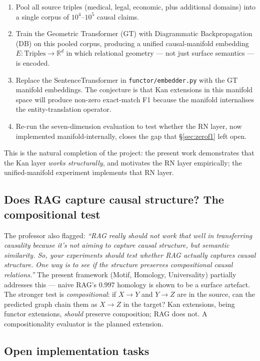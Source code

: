 \documentclass[10pt,letterpaper]{article}
\begin{document}
\begin{enumerate}
\item Pool all source triples (medical, legal, economic, plus additional domains) into a single corpus of $10^4$--$10^5$ causal claims.
\item Train the Geometric Transformer (GT) with Diagrammatic Backpropagation (DB) on this pooled corpus, producing a unified causal-manifold embedding $E : \text{Triples} \to \mathbb{R}^d$ in which relational geometry --- not just surface semantics --- is encoded.
\item Replace the SentenceTransformer in \texttt{functor/embedder.py} with the GT manifold embeddings. The conjecture is that Kan extensions in this manifold space will produce non-zero exact-match F1 because the manifold internalises the entity-translation operator.
\item Re-run the seven-dimension evaluation to test whether the RN layer, now implemented manifold-internally, closes the gap that \S\ref{sec:zerof1} left open.
\end{enumerate}

This is the natural completion of the project: the present work demonstrates that the Kan layer \emph{works structurally}, and motivates the RN layer empirically; the unified-manifold experiment implements that RN layer.

\subsection{Does RAG capture causal structure? The compositional test}

The professor also flagged: \emph{``RAG really should not work that well in transferring causality because it's not aiming to capture causal structure, but semantic similarity. So, your experiments should test whether RAG actually captures causal structure. One way is to see if the structure preserves compositional causal relations.''} The present framework (Motif, Homology, Universality) partially addresses this --- naive RAG's $0.997$ homology is shown to be a surface artefact. The stronger test is \emph{compositional}: if $X\!\to\!Y$ and $Y\!\to\!Z$ are in the source, can the predicted graph chain them as $X\!\to\!Z$ in the target? Kan extensions, being functor extensions, \emph{should} preserve composition; RAG does not. A compositionality evaluator is the planned extension.

\subsection{Open implementation tasks}
\end{document}
